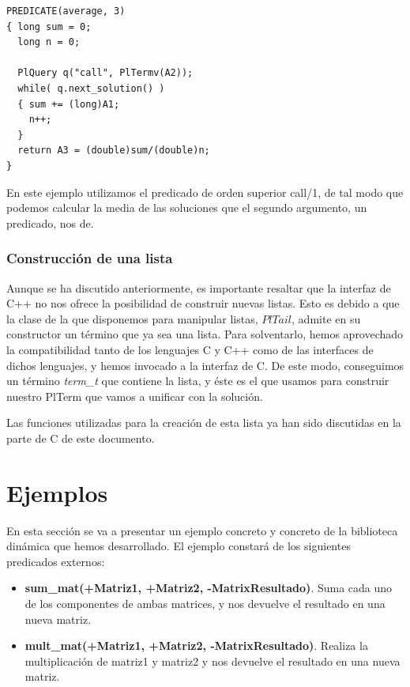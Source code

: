 \documentclass[a4paper,12pt]{article}
\begin{document}
\begin{lstlisting}[style=C++]
PREDICATE(average, 3)
{ long sum = 0;
  long n = 0;

  PlQuery q("call", PlTermv(A2));
  while( q.next_solution() )
  { sum += (long)A1;
    n++;
  }
  return A3 = (double)sum/(double)n;
}
\end{lstlisting}

En este ejemplo utilizamos el predicado de orden superior call/1, de tal modo que podemos calcular la media de las soluciones que el segundo argumento, un predicado, nos de.

\subsubsection{Construcción de una lista}

Aunque se ha discutido anteriormente, es importante resaltar que la interfaz de C++ no nos ofrece la posibilidad de construir nuevas listas. Esto es debido a que la clase de la que disponemos para manipular listas, $PlTail$, admite en su constructor un término que ya sea una lista. Para solventarlo, hemos aprovechado la compatibilidad tanto de los lenguajes C y C++ como de las interfaces de dichos lenguajes, y hemos invocado a la interfaz de C. De este modo, conseguimos un término \textit{term\_t} que contiene la lista, y éste es el que usamos para construir nuestro PlTerm que vamos a unificar con la solución. 

Las funciones utilizadas para la creación de esta lista ya han sido discutidas en la parte de C de este documento.

\section{Ejemplos}

En esta sección se va a presentar un ejemplo concreto y concreto de la biblioteca dinámica que hemos desarrollado. El ejemplo constará de los siguientes predicados externos:

\begin{itemize}
\item \textbf{sum\_mat(+Matriz1, +Matriz2, -MatrixResultado)}. Suma cada uno de los componentes de ambas matrices, y nos devuelve el resultado en una nueva matriz.
\item \textbf{mult\_mat(+Matriz1, +Matriz2, -MatrixResultado)}. Realiza la multiplicación de matriz1 y matriz2 y nos devuelve el resultado en una nueva matriz.
\end{itemize}
\end{document}
